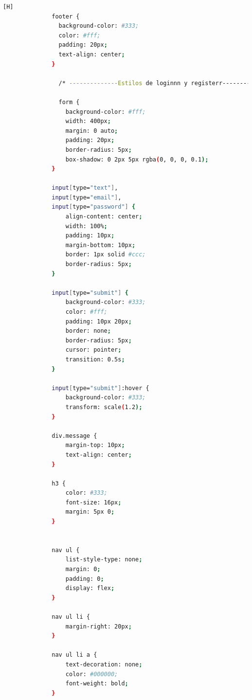 \documentclass{article}
\begin{document}
\begin{lstlisting}[language=bash,caption={styles.css}][H]
              footer {
                background-color: #333;
                color: #fff;
                padding: 20px;
                text-align: center;
              }
              
                /* --------------Estilos de loginnn y registerr--------------- */
               
                form {
                  background-color: #fff;
                  width: 400px;
                  margin: 0 auto;
                  padding: 20px;
                  border-radius: 5px;
                  box-shadow: 0 2px 5px rgba(0, 0, 0, 0.1);
              }
              
              input[type="text"],
              input[type="email"],
              input[type="password"] {
                  align-content: center;
                  width: 100%;
                  padding: 10px;
                  margin-bottom: 10px;
                  border: 1px solid #ccc;
                  border-radius: 5px;
              }
              
              input[type="submit"] {
                  background-color: #333;
                  color: #fff;
                  padding: 10px 20px;
                  border: none;
                  border-radius: 5px;
                  cursor: pointer;
                  transition: 0.5s;
              }
              
              input[type="submit"]:hover {
                  background-color: #333;
                  transform: scale(1.2);
              }
              
              div.message {
                  margin-top: 10px;
                  text-align: center;
              }
              
              h3 {
                  color: #333;
                  font-size: 16px;
                  margin: 5px 0;
              }
              
              
              nav ul {
                  list-style-type: none;
                  margin: 0;
                  padding: 0;
                  display: flex;
              }
              
              nav ul li {
                  margin-right: 20px;
              }
              
              nav ul li a {
                  text-decoration: none;
                  color: #000000;
                  font-weight: bold;
              }
              

\end{lstlisting}
\end{document}
